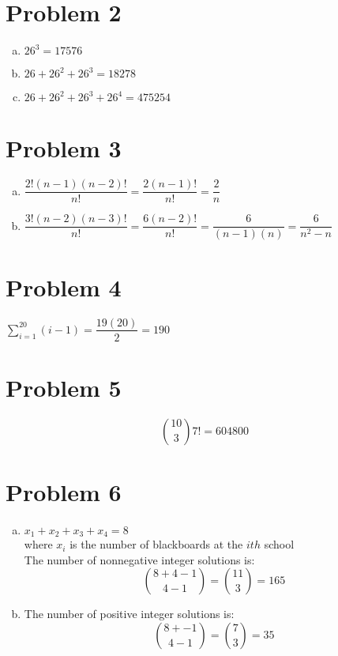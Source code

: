 \documentclass{article}
\begin{document}
\begin{flushleft}
\section*{Problem 2}
\begin{enumerate}[(a)]
\item $26^3=17576$
\item $26+26^2+26^3=18278$
\item $26+26^2+26^3+26^4=475254$
\end{enumerate}
\section*{Problem 3}
\begin{enumerate}[(a)]
\item $\dfrac{2!(n-1)(n-2)!}{n!}=\dfrac{2(n-1)!}{n!}=\dfrac{2}{n}$
\item $\dfrac{3!(n-2)(n-3)!}{n!}=\dfrac{6(n-2)!}{n!}=\dfrac{6}{(n-1)(n)}=\dfrac{6}{n^2-n}$
\end{enumerate}
\pagebreak
\section*{Problem 4}
$\sum \limits_{i=1}^{20}(i-1)=\dfrac{19(20)}{2}=190$
\section*{Problem 5}
\[{10\choose 3}7!=604800
\]
\section*{Problem 6}
\begin{enumerate}[(a)]
\item $x_1+x_2+x_3+x_4=8$\\
where $x_i$ is the number of blackboards at the $ith$ school\\
The number of nonnegative integer solutions is:
\[{8+4-1\choose 4-1}={11\choose 3}=165
\]
\item The number of positive integer solutions is:
\[{8+-1\choose 4-1}={7\choose 3}=35
\]
\end{enumerate}
\pagebreak

\end{flushleft}
\end{document}

